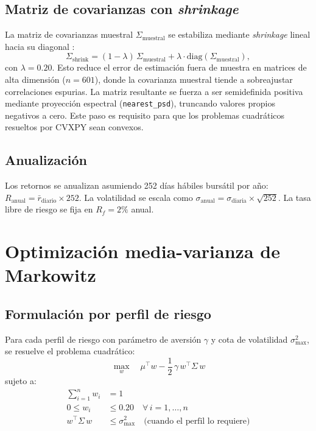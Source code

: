 \subsection{Matriz de covarianzas con \textit{shrinkage}}

La matriz de covarianzas muestral $\Sigma_{\text{muestral}}$ se estabiliza
mediante \textit{shrinkage} lineal hacia su diagonal
\cite{ledoit2004}:
\begin{equation}
\Sigma_{\text{shrink}} = (1 - \lambda)\,\Sigma_{\text{muestral}}
+ \lambda \cdot \text{diag}(\Sigma_{\text{muestral}}),
\end{equation}
con $\lambda = 0.20$. Esto reduce el error de estimaci\'on fuera de muestra en
matrices de alta dimensi\'on ($n = 601$), donde la covarianza muestral tiende
a sobreajustar correlaciones espurias. La matriz resultante se fuerza a ser
semidefinida positiva mediante proyecci\'on espectral
(\texttt{nearest\_psd}), truncando valores propios negativos a cero. Este paso
es requisito para que los problemas cuadr\'aticos resueltos por CVXPY sean
convexos.

\subsection{Anualizaci\'on}

Los retornos se anualizan asumiendo 252 d\'ias h\'abiles bursátil por a\~no:
$R_{\text{anual}} = \bar{r}_{\text{diario}} \times 252$. La volatilidad se
escala como $\sigma_{\text{anual}} = \sigma_{\text{diaria}} \times
\sqrt{252}$. La tasa libre de riesgo se fija en $R_f = 2\%$ anual.

\section{Optimizaci\'on media-varianza de Markowitz}

\subsection{Formulaci\'on por perfil de riesgo}

Para cada perfil de riesgo con par\'ametro de aversi\'on $\gamma$ y cota de
volatilidad $\sigma_{\max}^2$, se resuelve el problema cuadr\'atico:
\begin{equation}
\max_{w} \quad \mu^\top w - \frac{1}{2}\,\gamma\, w^\top \Sigma\, w
\end{equation}
sujeto a:
\begin{align}
\sum_{i=1}^{n} w_i &= 1 \\
0 \leq w_i &\leq 0.20 \quad \forall\, i = 1, \ldots, n \\
w^\top \Sigma\, w &\leq \sigma_{\max}^2
\quad \text{(cuando el perfil lo requiere)}
\end{align}

